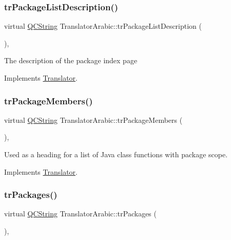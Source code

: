 \subsubsection{\texorpdfstring{trPackageListDescription()}{trPackageListDescription()}}
{\footnotesize\ttfamily virtual \mbox{\hyperlink{class_q_c_string}{Q\+C\+String}} Translator\+Arabic\+::tr\+Package\+List\+Description (\begin{DoxyParamCaption}{ }\end{DoxyParamCaption})\hspace{0.3cm}{\ttfamily [inline]}, {\ttfamily [virtual]}}

The description of the package index page 

Implements \mbox{\hyperlink{class_translator}{Translator}}.

\mbox{\label{class_translator_arabic_a8ad719e5ac01f9436a1030e353ff87ba}} 
\subsubsection{\texorpdfstring{trPackageMembers()}{trPackageMembers()}}
{\footnotesize\ttfamily virtual \mbox{\hyperlink{class_q_c_string}{Q\+C\+String}} Translator\+Arabic\+::tr\+Package\+Members (\begin{DoxyParamCaption}{ }\end{DoxyParamCaption})\hspace{0.3cm}{\ttfamily [inline]}, {\ttfamily [virtual]}}

Used as a heading for a list of Java class functions with package scope. 

Implements \mbox{\hyperlink{class_translator}{Translator}}.

\mbox{\label{class_translator_arabic_a072aa43f25aa0fbff418fcc8a777e769}} 
\subsubsection{\texorpdfstring{trPackages()}{trPackages()}}
{\footnotesize\ttfamily virtual \mbox{\hyperlink{class_q_c_string}{Q\+C\+String}} Translator\+Arabic\+::tr\+Packages (\begin{DoxyParamCaption}{ }\end{DoxyParamCaption})\hspace{0.3cm}{\ttfamily [inline]}, {\ttfamily [virtual]}}

